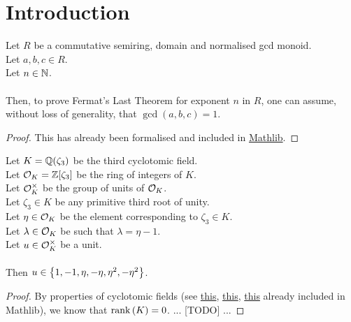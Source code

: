 \chapter{Introduction}

\begin{lemma}
    \label{lmm:fermatLastTheoremWith_of_fermatLastTheoremWith_coprime}
    \leanok
    Let $R$ be a commutative semiring, domain and normalised gcd monoid.\\%
    Let $a, b, c \in R$. \\
    Let $n \in \mathbb{N}$. \\\\
    Then, to prove Fermat's Last Theorem for exponent $n$ in $R$,
    one can assume, without loss of generality, that $\gcd(a,b,c)=1$.
\end{lemma}
\begin{proof}
    \leanok
    This has already been formalised and included in \href{https://pitmonticone.github.io/FLT3/docs/FLT3/Mathlib/NumberTheory/FLT/Basic.html#fermatLastTheoremWith_of_fermatLastTheoremWith_coprime}{Mathlib}.
\end{proof}

\begin{theorem}
    \label{thm:mem}
    \leanok
    Let $K = \mathbb{Q}(\zeta_3)$ be the third cyclotomic field. \\
    Let $\mathcal{O}_K = \mathbb{Z}[\zeta_3]$ be the ring of integers of $K$. \\
    Let $\mathcal{O}^\times_K$ be the group of units of $\mathcal{O}_K$. \\
    Let $\zeta_3 \in K$ be any primitive third root of unity. \\
    Let $\eta \in \mathcal{O}_K$ be the element corresponding to $\zeta_3 \in K$. \\
    Let $\lambda \in \mathcal{O}_K$ be such that $\lambda = \eta -1$. \\
    Let $u \in \mathcal{O}^\times_K$ be a unit. \\\\
    Then $u \in \left\{1, -1, \eta, -\eta, \eta^2, -\eta^2\right\}$.
\end{theorem}
\begin{proof}
    \leanok
    By properties of cyclotomic fields
    (see \href{https://pitmonticone.github.io/FLT3/docs/Mathlib/NumberTheory/NumberField/Embeddings.html#NumberField.InfinitePlace.card_eq_nrRealPlaces_add_nrComplexPlaces}{this},
    \href{https://pitmonticone.github.io/FLT3/docs/FLT3/Mathlib/NumberTheory/Cyclotomic/Embeddings.html#IsCyclotomicExtension.Rat.nrRealPlaces_eq_zero}{this},
    \href{https://pitmonticone.github.io/FLT3/docs/FLT3/Mathlib/NumberTheory/Cyclotomic/Embeddings.html#IsCyclotomicExtension.Rat.nrComplexPlaces_eq_totient_div_two}{this}
    already included in Mathlib), we know that $\mathrm{rank}\left(K\right) = 0$.
    ... [TODO] ...
\end{proof}

